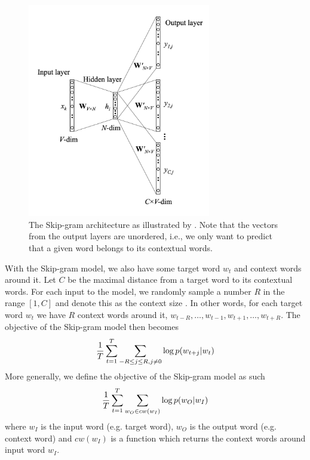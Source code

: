 \begin{figure}[ht]
    \centering
    \includegraphics[width=8cm]{thesis/figures/skip-gram-rong-2016.png}
    \caption{The Skip-gram architecture as illustrated by  \cite{rong2016word2vec}. Note that the vectors from the output layers are unordered, i.e., we only want to predict that a given word belongs to its contextual words.}
    \label{fig:skip-gram-model}
\end{figure}

With the Skip-gram model, we also have some target word $w_t$ and context words around it. Let $C$ be the maximal distance from a target word to its contextual words. For each input to the model, we randomly sample a number $R$ in the range $[1, C]$ and denote this as the context size \cite{mikolov2013a}. In other words, for each target word $w_t$ we have $R$ context words around it, $w_{t-R}, \ldots, w_{t-1}, w_{t+1}, \ldots, w_{t+R}$. The objective of the Skip-gram model \cite{mikolov2013b} then becomes
\begin{align}
    \frac{1}{T} \sum\limits_{t=1}^{T} \sum\limits_{-R \leq j \leq R, j \neq 0}^{} \log p(w_{t+j} | w_t)
    \label{eqn:skip-gram-objective-function}
\end{align}
More generally, we define the objective of the Skip-gram model as such
\begin{align}
    \frac{1}{T} \sum\limits_{t=1}^{T} \sum\limits_{w_O \in cw(w_I)}^{} \log p(w_O | w_I)
    \label{eqn:skip-gram-objective-function-general}
\end{align}
where $w_I$ is the input word (e.g. target word), $w_O$ is the output word (e.g. context word) and $cw(w_I)$ is a function which returns the context words around input word $w_I$.

